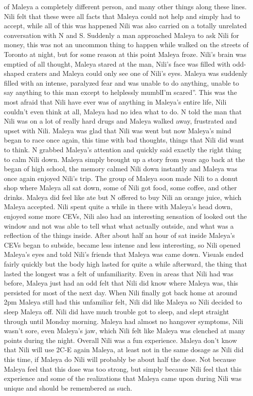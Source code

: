 \documentclass[12pt]{book}
\begin{document}
of Maleya a completely different person, and many other things along these lines. Nili felt that these were all facts that Maleya could not help and simply had to accept, while all of this was happened Nili was also carried on a totally unrelated conversation with N and S. Suddenly a man approached Maleya to ask Nili for money, this was not an uncommon thing to happen while walked on the streets of Toronto at night, but for some reason at this point Maleya froze. Nili's brain was emptied of all thought, Maleya stared at the man, Nili's face was filled with odd-shaped craters and Maleya could only see one of Nili's eyes. Maleya was suddenly filled with an intense, paralyzed fear and was unable to do anything, unable to say anything to this man except to helplessly mumblI'm scared''. This was the most afraid that Nili have ever was of anything in Maleya's entire life, Nili couldn't even think at all, Maleya had no idea what to do. N told the man that Nili was on a lot of really hard drugs and Maleya walked away, frustrated and upset with Nili. Maleya was glad that Nili was went but now Maleya's mind began to race once again, this time with bad thoughts, things that Nili did want to think. N grabbed Maleya's attention and quickly said exactly the right thing to calm Nili down. Maleya simply brought up a story from years ago back at the began of high school, the memory calmed Nili down instantly and Maleya was once again enjoyed Nili's trip. The group of Maleya soon made Nili to a donut shop where Maleya all sat down, some of Nili got food, some coffee, and other drinks. Maleya did feel like ate but N offered to buy Nili an orange juice, which Maleya accepted. Nili spent quite a while in there with Maleya's head down, enjoyed some more CEVs, Nili also had an interesting sensation of looked out the window and not was able to tell what what actually outside, and what was a reflection of the things inside. After about half an hour of sat inside Maleya's CEVs began to subside, became less intense and less interesting, so Nili opened Maleya's eyes and told Nili's friends that Maleya was came down. Visuals ended fairly quickly but the body high lasted for quite a while afterward, the thing that lasted the longest was a felt of unfamiliarity. Even in areas that Nili had was before, Maleya just had an odd felt that Nili did know where Maleya was, this persisted for most of the next day. When Nili finally got back home at around 2pm Maleya still had this unfamiliar felt, Nili did like Maleya so Nili decided to sleep Maleya off. Nili did have much trouble got to sleep, and slept straight through until Monday morning. Maleya had almost no hangover symptoms, Nili wasn't sore, even Maleya's jaw, which Nili felt like Maleya was clenched at many points during the night. Overall Nili was a fun experience. Maleya don't know that Nili will use 2C-E again Maleya, at least not in the same dosage as Nili did this time, if Maleya do Nili will probably be about half the dose. Not because Maleya feel that this dose was too strong, but simply because Nili feel that this experience and some of the realizations that Maleya came upon during Nili was unique and should be remembered as such.
\end{document}
